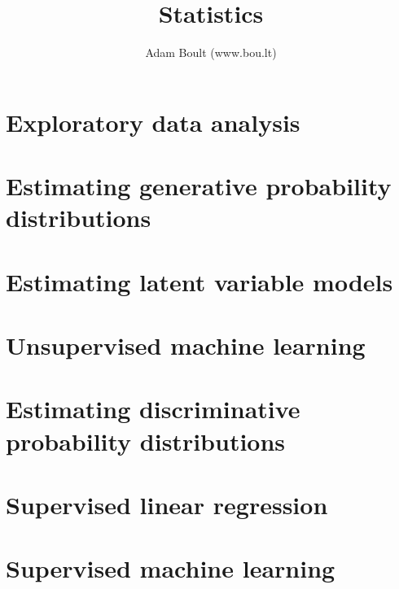 \documentclass[oneside]{book}
\begin{document}
\author{Adam Boult (www.bou.lt)}
\title{Statistics}
\maketitle

\setcounter{tocdepth}{0}
\tableofcontents



\part{Exploratory data analysis}











\part{Estimating generative probability distributions}













\part{Estimating latent variable models}


\part{Unsupervised machine learning}



\part{Estimating discriminative probability distributions}





\part{Supervised linear regression}






\part{Supervised machine learning}

















\end{document}
